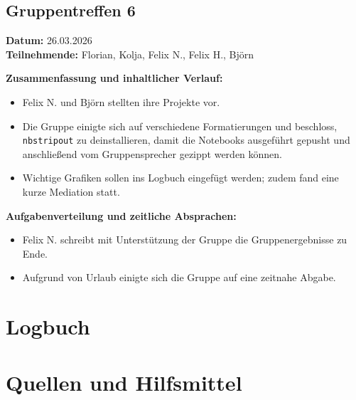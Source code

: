 \documentclass[9pt,a4paper,twocolumn,twoside]{tau-class/tau}
\begin{document}
\subsection*{Gruppentreffen 6}
\textbf{Datum:} 26.03.2026 \\
\textbf{Teilnehmende:} Florian, Kolja, Felix N., Felix H., Björn

\textbf{Zusammenfassung und inhaltlicher Verlauf:}
\begin{itemize}
    \item Felix N. und Björn stellten ihre Projekte vor.
    \item Die Gruppe einigte sich auf verschiedene Formatierungen und beschloss, \texttt{nbstripout} zu deinstallieren, damit die Notebooks ausgeführt gepusht und anschließend vom Gruppensprecher gezippt werden können.
    \item Wichtige Grafiken sollen ins Logbuch eingefügt werden; zudem fand eine kurze Mediation statt.
\end{itemize}

\textbf{Aufgabenverteilung und zeitliche Absprachen:}
\begin{itemize}
    \item Felix N. schreibt mit Unterstützung der Gruppe die Gruppenergebnisse zu Ende.
    \item Aufgrund von Urlaub einigte sich die Gruppe auf eine zeitnahe Abgabe.
\end{itemize}

\newpage 
\section{Logbuch}

\newpage 
\section{Quellen und Hilfsmittel}
\printbibliography
\end{document}
